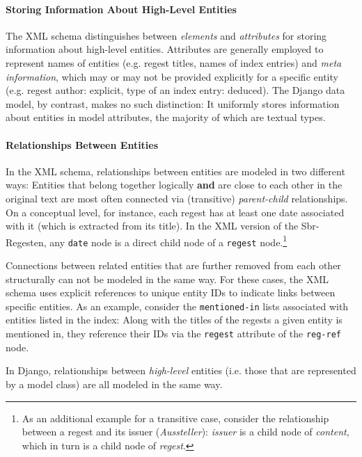\paragraph{Storing Information About High-Level Entities}

The XML schema distinguishes between \emph{elements} and
\emph{attributes} for storing information about high-level entities.
Attributes are generally employed to represent names of entities (e.g.
regest titles, names of index entries) and \emph{meta information},
which may or may not be provided explicitly for a specific entity
(e.g. regest author: explicit, type of an index entry: deduced). The
Django data model, by contrast, makes no such distinction: It
uniformly stores information about entities in model attributes, the
majority of which are textual types.

\paragraph{Relationships Between Entities}

In the XML schema, relationships between entities are modeled in two
different ways: Entities that belong together logically \textbf{and}
are close to each other in the original text are most often connected
via (transitive) \emph{parent-child} relationships. On a conceptual
level, for instance, each regest has at least one date associated with
it (which is extracted from its title). In the XML version of the
Sbr-Regesten, any \texttt{date} node is a direct child node of a
\texttt{regest} node.\footnote{As an additional example for a
  transitive case, consider the relationship between a regest and its
  issuer (\emph{Aussteller}): \emph{issuer} is a child node of
  \emph{content}, which in turn is a child node of \emph{regest}.}

Connections between related entities that are further removed from
each other structurally can not be modeled in the same way. For these
cases, the XML schema uses explicit references to unique entity IDs to
indicate links between specific entities. As an example, consider the
\texttt{mentioned-in} lists associated with entities listed in the
index: Along with the titles of the regests a given entity is
mentioned in, they reference their IDs via the \texttt{regest}
attribute of the \texttt{reg-ref} node.

In Django, relationships between \emph{high-level} entities (i.e.
those that are represented by a model class) are all modeled in the
same way.

